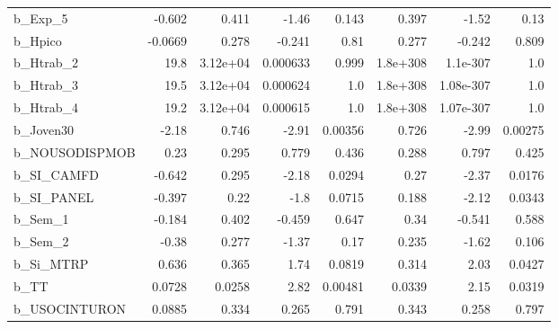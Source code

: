 \begin{tabular}{lrrrrrrr}
b\_Exp\_5        &  -0.602 &    0.411 &     -1.46 &    0.143 &         0.397 &        -1.52 &          0.13 \\
b\_Hpico        & -0.0669 &    0.278 &    -0.241 &     0.81 &         0.277 &       -0.242 &         0.809 \\
b\_Htrab\_2      &    19.8 & 3.12e+04 &  0.000633 &    0.999 &      1.8e+308 &     1.1e-307 &           1.0 \\
b\_Htrab\_3      &    19.5 & 3.12e+04 &  0.000624 &      1.0 &      1.8e+308 &    1.08e-307 &           1.0 \\
b\_Htrab\_4      &    19.2 & 3.12e+04 &  0.000615 &      1.0 &      1.8e+308 &    1.07e-307 &           1.0 \\
b\_Joven30      &   -2.18 &    0.746 &     -2.91 &  0.00356 &         0.726 &        -2.99 &       0.00275 \\
b\_NOUSODISPMOB &    0.23 &    0.295 &     0.779 &    0.436 &         0.288 &        0.797 &         0.425 \\
b\_SI\_CAMFD     &  -0.642 &    0.295 &     -2.18 &   0.0294 &          0.27 &        -2.37 &        0.0176 \\
b\_SI\_PANEL     &  -0.397 &     0.22 &      -1.8 &   0.0715 &         0.188 &        -2.12 &        0.0343 \\
b\_Sem\_1        &  -0.184 &    0.402 &    -0.459 &    0.647 &          0.34 &       -0.541 &         0.588 \\
b\_Sem\_2        &   -0.38 &    0.277 &     -1.37 &     0.17 &         0.235 &        -1.62 &         0.106 \\
b\_Si\_MTRP      &   0.636 &    0.365 &      1.74 &   0.0819 &         0.314 &         2.03 &        0.0427 \\
b\_TT           &  0.0728 &   0.0258 &      2.82 &  0.00481 &        0.0339 &         2.15 &        0.0319 \\
b\_USOCINTURON  &  0.0885 &    0.334 &     0.265 &    0.791 &         0.343 &        0.258 &         0.797 \\
\bottomrule
\end{tabular}

